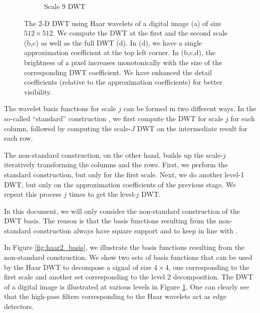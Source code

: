 \begin{figure}
\begin{subfigure}{0.4\textwidth}
  \caption{Scale 9 DWT}
\end{subfigure}
\caption[2-D Haar DWT Example]{The 2-D DWT using Haar wavelets of a digital image (a) of size $512\times 512$.
  We compute the DWT at the first and the second scale (b,c) as well as the full DWT (d).
  In (d), we have a single approximation coefficient at the top left corner.
  In (b,c,d), the brightness of a pixel increases monotonically with the size of the corresponding DWT coefficient.
  We have enhanced the detail coefficients (relative to the approximation coefficients) for better visibility.}
\label{fig:dwt2}
\end{figure}

The wavelet basis functions for scale $j$ can be formed in two different ways.
In the so-called ``standard'' construction \cite{stollnitz1995}, we first compute the DWT for scale $j$ for each column, followed by computing the scale-$J$ DWT on the intermediate result for each row.

The non-standard construction, on the other hand, builds up the scale-$j$ iteratively transforming the columns and the rows.
First, we perform the standard construction, but only for the first scale.
Next, we do another level-1 DWT, but only on the approximation coefficients of the previous stage.
We repeat this process $j$ times to get the level-$j$ DWT.

In this document, we will only consider the non-standard construction of the DWT basis.
The reason is that the basis functions resulting from the non-standard construction always have square support and to keep in line with \cite{pilikos2014}.

In Figure \ref{fig:haar2_basis}, we illustrate the basis functions resulting from the non-standard construction. 
We show two sets of basis functions that can be used by the Haar DWT to decompose a signal of size $4\times 4$, one corresponding to the first scale and another set corresponding to the level 2 decomposition.
The DWT of a digital image is illustrated at various levels in Figure \ref{fig:dwt2}.
One can clearly see that the high-pass filters corresponding to the Haar wavelets act as edge detectors.


